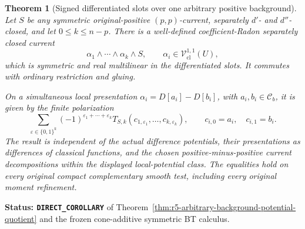\documentclass[11pt,a4paper]{article}
\numberwithin{equation}{section}
\newtheorem{theorem}{Theorem}[section]
\theoremstyle{definition}
\theoremstyle{remark}
\begin{document}
\begin{theorem}[Signed differentiated slots over one arbitrary positive background]
\label{thm:r5-signed-potential-current-products}
Let $S$ be any symmetric original-positive $(p,p)$-current,
separately $d'$- and $d''$-closed, and let $0\leq k\leq n-p$.
There is a well-defined coefficient-Radon separately closed
current
\[
        \alpha_1\wedge\cdots\wedge\alpha_k\wedge S,
       \qquad \alpha_i\in\mathscr V^{1,1}_{\mathrm{cl}}(U),
\]
which is symmetric and real multilinear in the differentiated
slots.  It commutes with ordinary restriction and gluing.

On a simultaneous local presentation
$\alpha_i=D[a_i]-D[b_i]$, with $a_i,b_i\in\mathcal C_b$, it
is given by the finite polarization
\begin{equation}
 \sum_{\varepsilon\in\{0,1\}^k}
   (-1)^{\varepsilon_1+\cdots+\varepsilon_k}
   T_{S,k}(c_{1,\varepsilon_1},\ldots,c_{k,\varepsilon_k}),
 \qquad c_{i,0}=a_i,\quad c_{i,1}=b_i.
 \label{eq:r5-signed-potential-polarization}
\end{equation}
The result is independent of the actual difference potentials,
their presentations as differences of classical functions, and
the chosen positive-minus-positive current decompositions
within the displayed local-potential class.  The equalities
hold on every original compact complementary smooth test,
including every original moment refinement.
\end{theorem}

\noindent\textbf{Status: \texttt{DIRECT\_COROLLARY}} of
Theorem~\ref{thm:r5-arbitrary-background-potential-quotient}
and the frozen cone-additive symmetric BT calculus.
\end{document}

